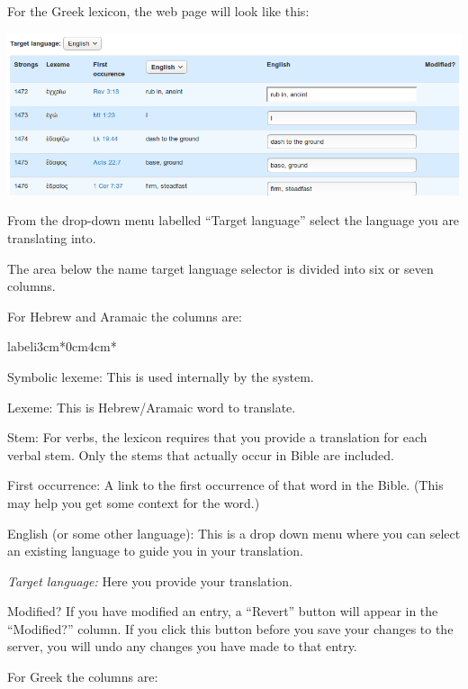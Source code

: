 \documentclass[11pt,oneside,a4paper]{memoir}
\begin{document}
For the Greek lexicon, the web page will look like this:

\begin{center}
  \includegraphics[width=0.9\linewidth]{lexiconGr.png}
\end{center}

From the drop-down menu labelled ``Target language'' select the language you are translating into.

The area below the name target language selector is divided into six or seven columns.

For Hebrew and Aramaic the columns are:

\begin{flexlabelled}{labeli}{3cm}{*}{0cm}{4cm}{*}
\item[Symbolic lexeme:\hfill] This is used internally by the system.
\item[Lexeme:] This is Hebrew/Aramaic word to translate.
\item[Stem:] For verbs, the lexicon requires that you provide a translation for each verbal stem.
  Only the stems that actually occur in Bible are included.
\item[First occurrence:\hfill] A link to the first occurrence of that word in the Bible. (This may
  help you get some context for the word.)
\item[English (or some other language):] This is a drop down menu where you can select an existing
  language to guide you in your translation.
\item[\emph{Target language:}\hfill]  Here you provide your translation.
\item[Modified?] If you have modified an entry, a ``Revert'' button will appear in the ``Modified?''
  column. If you click this button before you save your changes to the server, you will undo any
  changes you have made to that entry.
\end{flexlabelled}

For Greek the columns are:
\end{document}
